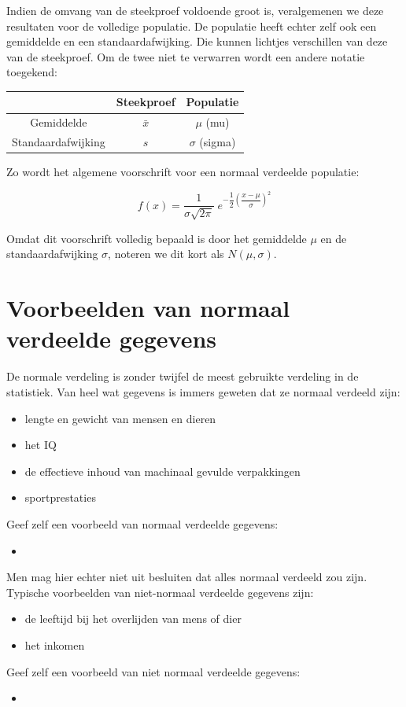 \documentclass[12pt,twoside]{article}
\begin{document}
{Indien de omvang van de steekproef voldoende groot is, veralgemenen we deze resultaten voor de volledige populatie. De populatie heeft echter zelf ook een gemiddelde en een standaardafwijking. Die kunnen lichtjes verschillen van deze van de steekproef. Om de twee niet te verwarren wordt een andere notatie toegekend:

\begin{center}
\begin{tabular}{c|c|c}
& Steekproef & Populatie\\
\hline
Gemiddelde & $\bar{x}$ & $\mu$ (mu)\\
Standaardafwijking & $s$ & $\sigma$ (sigma)\\
\end{tabular}
\end{center}

Zo wordt het algemene voorschrift voor een normaal verdeelde populatie:

$$f(x)=\dfrac{1}{\sigma{\sqrt{2\pi}}}\;e^{-\dfrac{1}{2}\left(\dfrac{x-\mu}{\sigma}\right)^2}$$

Omdat dit voorschrift volledig bepaald is door het gemiddelde $\mu$ en de standaardafwijking $\sigma$, noteren we dit kort als $N(\mu,\sigma)$.

\pagebreak
\section{Voorbeelden van normaal verdeelde gegevens}

De normale verdeling is zonder twijfel de meest gebruikte verdeling in de statistiek. Van heel wat gegevens is immers geweten dat ze normaal verdeeld zijn:
\begin{itemize}
  \item lengte en gewicht van mensen en dieren
  \item het IQ
  \item de effectieve inhoud van machinaal gevulde verpakkingen
  \item sportprestaties
\end{itemize}
\begin{oefening} Geef zelf een voorbeeld van normaal verdeelde gegevens:
\begin{itemize}
  \item \dotfill
\end{itemize}
\end{oefening}

Men mag hier echter niet uit besluiten dat alles normaal verdeeld zou zijn. Typische voorbeelden van niet-normaal verdeelde gegevens zijn:
\begin{itemize}
  \item de leeftijd bij het overlijden van mens of dier
  \item het inkomen
\end{itemize}
\begin{oefening} Geef zelf een voorbeeld van niet normaal verdeelde gegevens:
\begin{itemize}
  \item \dotfill
\end{itemize}
\end{oefening}

}
\end{document}
